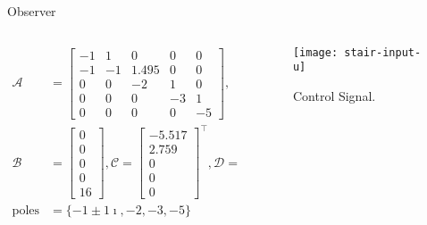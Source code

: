 \begin{slide}{Observer}
  \begin{columns}[c]
    \begin{column}{0.55\textwidth}
      \begin{align}
        \mathcal{A}    & = \begin{bmatrix}
                             -1 & 1  & 0     & 0  & 0  \\
                             -1 & -1 & 1.495 & 0  & 0  \\
                             0  & 0  & -2    & 1  & 0  \\
                             0  & 0  & 0     & -3 & 1  \\
                             0  & 0  & 0     & 0  & -5
                           \end{bmatrix},        \\
        \mathcal{B}    & =\begin{bmatrix}
                            0 \\ 0 \\ 0 \\ 0 \\ 16
                          \end{bmatrix},
        \mathcal{C} = \begin{bmatrix}
                        -5.517 \\ 2.759 \\ 0 \\ 0 \\ 0
                      \end{bmatrix}^{\top},
        \mathcal{D} = 0                                     \\
        \textrm{poles} & = \{-1\pm{}1\imath{}, -2, -3, -5\}
      \end{align}
    \end{column}%
    \hfill%
    \begin{column}{0.55\textwidth}
      \begin{figure}[ht!]
        \centering
        \texttt{[image: stair-input-u]}
        \caption{Control Signal.}%
      \end{figure}
    \end{column}%
  \end{columns}
\end{slide}

